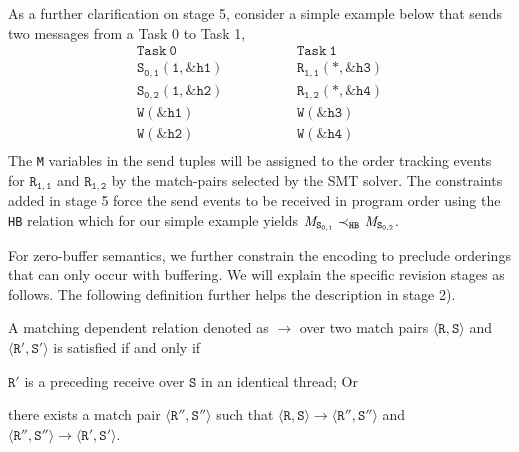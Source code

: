 As a further clarification on stage 5, consider a simple example
below that sends two messages from a Task 0 to Task 1,
\[
\begin{array}{l|l}
\;\;\;\;\;\;\;\;\mathtt{Task\ 0}\;\;\;\;\;\;\;\; & \;\;\;\;\;\;\;\; \mathtt{Task\ 1}\;\;\;\;\;\;\;\; \\
\hline
\;\;\;\;\;\;\;\;\mathtt{S_{0,1}(1,\&h1)}\;\;\;\;\;\;\;\; & \;\;\;\;\;\;\;\; \mathtt{R_{1,1}(*,\&h3)}\;\;\;\;\;\;\;\; \\
\;\;\;\;\;\;\;\;\mathtt{S_{0,2}(1,\&h2)}\;\;\;\;\;\;\;\; & \;\;\;\;\;\;\;\; \mathtt{R_{1,2}(*,\&h4)}\;\;\;\;\;\;\;\; \\
\;\;\;\;\;\;\;\;\mathtt{W(\&h1)}\;\;\;\;\;\;\;\; & \;\;\;\;\;\;\;\; \mathtt{W(\&h3)}\;\;\;\;\;\;\;\; \\
\;\;\;\;\;\;\;\;\mathtt{W(\&h2)}\;\;\;\;\;\;\;\; & \;\;\;\;\;\;\;\; \mathtt{W(\&h4)}\;\;\;\;\;\;\;\; \\
\end{array}
\]
The \texttt{M} variables in the send tuples will be assigned to the
order tracking events for $\mathtt{R_{1,1}}$ and $\mathtt{R_{1,2}}$ by the match-pairs selected by the SMT solver. The constraints added in stage 5 force the send events to be received in
program order using the \texttt{HB} relation which for our simple
example yields
$\cfgnt{M}_\mathtt{S_{0,1}}\ \mathrm{\prec_\mathtt{HB}}\ \cfgnt{M}_\mathtt{S_{0,2}}$.

For zero-buffer semantics, we further constrain the encoding to
preclude orderings that can only occur with buffering. We will explain the specific revision stages as follows. The following definition further helps the description in stage 2).

\begin{definition}
A matching dependent relation denoted as $\rightarrow$ over two match pairs $\langle\mathtt{R}, \mathtt{S}\rangle$ and $\langle\mathtt{R'}, \mathtt{S'}\rangle$ is satisfied if and only if
\begin{compactenum}
\item $\mathtt{R'}$ is a preceding receive over $\mathtt{S}$ in an identical thread; Or
\item there exists a match pair $\langle\mathtt{R''}, \mathtt{S''}\rangle$ such that $\langle\mathtt{R}, \mathtt{S}\rangle \rightarrow \langle\mathtt{R''}, \mathtt{S''}\rangle$ and $\langle\mathtt{R''}, \mathtt{S''}\rangle \rightarrow \langle\mathtt{R'}, \mathtt{S'}\rangle$.
\end{compactenum}
\end{definition}

